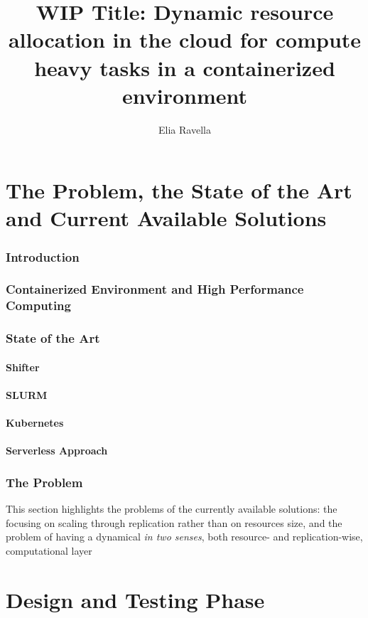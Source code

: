 \documentclass{article}
\title{WIP Title: Dynamic resource allocation in the cloud for compute heavy tasks in a containerized environment}
\author{Elia Ravella}
\begin{document}
	\begin{titlepage}
		\maketitle
	\end{titlepage}
	
	\tableofcontents
	\clearpage
	
	\part{The Problem, the State of the Art and Current Available Solutions}
		\section{Introduction}
		\section{Containerized Environment and High Performance Computing}
		\section{State of the Art}
			\subsection{Shifter}
			\subsection{SLURM}
			\subsection{Kubernetes}
			\subsection{Serverless Approach}
		\section{The Problem}
			This section highlights the problems of the currently available solutions: the focusing on scaling through replication rather than on resources size, and the problem of having a dynamical \textit{in two senses}, both resource- and replication-wise, computational layer
	
	\part{Design and Testing Phase}
\end{document}
